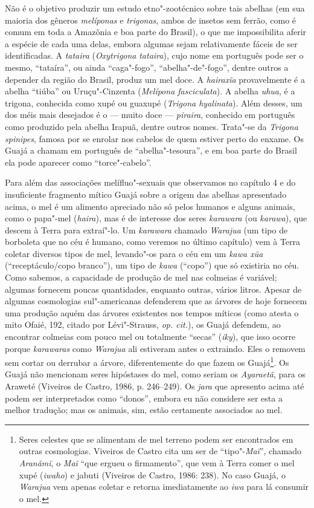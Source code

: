 Não é o objetivo produzir um estudo etno"-zootécnico sobre tais abelhas
(em sua maioria dos gêneros \emph{melíponas} e \emph{trigonas}, ambos de
insetos sem ferrão, como é comum em toda a Amazônia e boa parte do
Brasil), o que me impossibilita aferir a espécie de cada uma delas,
embora algumas sejam relativamente fáceis de ser identificadas. A
\emph{tataira} (\emph{Oxytrigona} \emph{tataira}), cujo nome em
português pode ser o mesmo, ``tataíra'', ou ainda ``caga"-fogo'',
``abelha"-de"-fogo'', dentre outros a depender da região do Brasil, produz
um mel doce. A \emph{hairaxĩa} provavelmente é a abelha ``tiúba'' ou
Uruçu"-Cinzenta (\emph{Melípona fasciculata}). A abelha \emph{uhua}, é a
trigona, conhecida como xupé ou guaxupé (\emph{Trigona hyalinata}). Além
desses, um dos méis mais desejados é o --- muito doce --- \emph{piraira},
conhecido em português como produzido pela abelha Irapuã, dentre outros
nomes. Trata"-se da \emph{Trigona spinipes}, famosa por se enrolar nos
cabelos de quem estiver perto do enxame. Os Guajá a chamam em português
de ``abelha"-tesoura'', e em boa parte do Brasil ela pode aparecer como
``torce"-cabelo''.

Para além das associações melífluo"-sexuais que observamos no capítulo 4
e do insuficiente fragmento mítico Guajá sobre a origem das abelhas
apresentado acima, o mel é um alimento apreciado não só pelos humanos e
alguns animais, como o papa"-mel (\emph{haira}), mas é de interesse dos
seres \emph{karawara} (ou \emph{karawa}), que descem à Terra para
extraí"-lo. Um \emph{karawara} chamado \emph{Warajua} (um tipo de
borboleta que no céu é humano, como veremos no último capítulo) vem à
Terra coletar diversos tipos de mel, levando"-os para o céu em um
\emph{kawa xũa} (``receptáculo/copo branco''), um tipo de \emph{kawa}
(``copo'') que só existiria no céu. Como sabemos, a capacidade de produção
de mel nas colmeias é variável; algumas fornecem poucas quantidades,
enquanto outras, vários litros. Apesar de algumas cosmologias
sul"-americanas defenderem que as árvores de hoje fornecem uma produção
aquém das árvores existentes nos tempos míticos (como atesta o mito
Ofaié, 192, citado por Lévi"-Strauss, \emph{op. cit.}), os Guajá defendem, ao
encontrar colmeias com pouco mel ou totalmente ``secas'' (\emph{iky}),
que isso ocorre porque \emph{karawaras} como \emph{Warajua} ali
estiveram antes o extraindo. Eles o removem sem cortar ou derrubar a
árvore, diferentemente do que fazem os Guajá\footnote{Seres celestes que
  se alimentam de mel terreno podem ser encontrados em outras
  cosmologias. Viveiros de Castro cita um ser de ``tipo"-\emph{Maĩ}'',
  chamado \emph{Aranãmĩ}, o \emph{Maĩ} ``que ergueu o firmamento'', que
  vem à Terra comer o mel xupé (\emph{iwaho}) e jabuti (Viveiros de
  Castro, 1986: 238). No caso Guajá, o \emph{Warajua} vem apenas coletar
  e retorna imediatamente ao \emph{iwa} para lá consumir o mel.}. Os
Guajá não mencionam seres hipóstases do mel, como seriam os
\emph{Ayaraetã}, para os Araweté (Viveiros de Castro, 1986, p. 246--249).
Os \emph{jara} que apresento acima até podem ser interpretados como
``donos'', embora eu não considere ser esta a melhor tradução; mas os
animais, sim, estão certamente associados ao mel.

